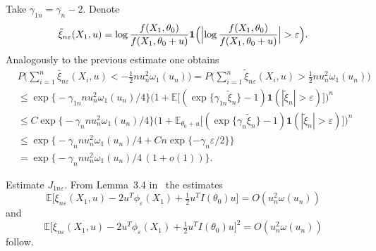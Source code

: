 \documentclass[11pt,a4paper]{article}
\begin{document}
Take $\gamma_{1n}=\gamma_n-2$. Denote
\[
\tilde\xi_{n\varepsilon}(X_1,u)=\log\frac{f(X_1,\theta_0)}{f(X_1,\theta_0+u)}\mathbf{1}\Bigl(\Bigl|\log\frac{f(X_1,\theta_0)}{f(X_1,\theta_0+u)}\Bigr|>\varepsilon\Bigr).
\]
Analogously to the previous estimate one obtains
\begin{equation}\label{qqur2}
\begin{split} 
&P\Biggl(\sum_{i=1}^n\bar\xi_{n\varepsilon}(X_i,u)<-\tfrac12 nu_n^2\omega_1(u_n)\Biggr)
=P\Biggl(\sum_{i=1}^n\tilde\xi_{n\varepsilon}(X_i,u)>\tfrac12 nu_n^2\omega_1(u_n)\Biggr)\\
&\le\exp\bigl\{-\gamma_{1n} nu_n^2\omega_1(u_n)/4\bigr\}\bigl(1+\mathbb{E}\bigl[(\exp\{\gamma_{1n}\tilde\xi_n\}-1)\mathbf{1}(|\tilde\xi_n|>\varepsilon)\bigr]\bigr)^n\\
&\le C\exp\bigl\{-\gamma_n nu_n^2\omega_1(u_n)/4\bigr\}\bigl(1+\mathbb{E}_{\theta_0+u}\bigl[(\exp\{\gamma_n\tilde\xi_n\}-1)\mathbf{1}(|\tilde\xi_n|>\varepsilon)\bigr]\bigr)^n\\
&\le\exp\bigl\{-\gamma_n nu_n^2\omega_1(u_n)/4+Cn\exp\{-\gamma_n\varepsilon/2\}\bigr\}\\
&=\exp\bigl\{-\gamma_n nu_n^2\omega_1(u_n)/4\,(1+o(1))\bigr\}.
\end{split}
\end{equation}

Estimate $J_{1n\varepsilon}$. From Lemma~3.4 in~\cite{3} the estimates
\begin{equation}
\mathbb{E}\bigl[\xi_{n\varepsilon}(X_1,u)-2u^T\phi_\varepsilon(X_1)+\tfrac12 u^T I(\theta_0)u\bigr]=O(u_n^2\omega(u_n))
\label{eq:49}
\end{equation}
and
\begin{equation}
\mathbb{E}\bigl[\xi_{n\varepsilon}(X_1,u)-2u^T\phi_\varepsilon(X_1)+\tfrac12 u^T I(\theta_0)u\bigr]^2=O(u_n^2\omega(u_n))
\label{eq:50}
\end{equation}
follow.
\end{document}
